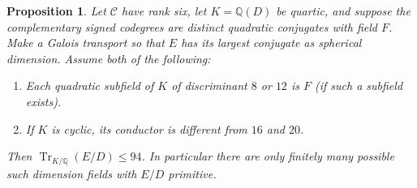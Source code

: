 \documentclass[11pt,reqno]{amsart}
\newtheorem{proposition}[theorem]{Proposition}
\theoremstyle{remark}\newtheorem{remark}[theorem]{Remark}
\numberwithin{equation}{section}
\begin{document}
\begin{proposition}\label{prop:quartic-primitive-norm-height}
Let $\mathcal C$ have rank six, let $K=\mathbb Q(D)$ be quartic,
and suppose the complementary signed codegrees are distinct
quadratic conjugates with field $F$. Make a Galois transport
so that $E$ has its largest conjugate as spherical dimension.
Assume both of the following:
\begin{enumerate}
\item Each quadratic subfield of $K$ of discriminant $8$ or $12$
is $F$ (if such a subfield exists).
\item If $K$ is cyclic, its conductor is different from $16$ and $20$.
\end{enumerate}
Then $\operatorname{Tr}_{K/\mathbb Q}(E/D)\le94$.
In particular there are only finitely many possible such dimension
fields with $E/D$ primitive.
\end{proposition}
\end{document}
